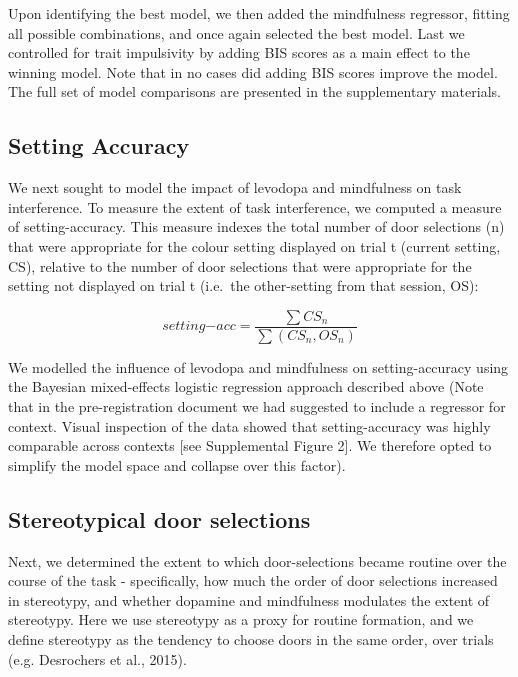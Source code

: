 \documentclass[
  man]{apa6}
\begin{document}
Upon identifying the best model, we then added the mindfulness regressor, fitting all possible combinations, and once again selected the best model. Last we controlled for trait impulsivity by adding BIS scores as a main effect to the winning model. Note that in no cases did adding BIS scores improve the model. The full set of model comparisons are presented in the supplementary materials.

\hypertarget{setting-accuracy}{%
\subsection{Setting Accuracy}\label{setting-accuracy}}

\label{sec:Setting Accuracy}

We next sought to model the impact of levodopa and mindfulness on task interference. To measure the extent of task interference, we computed a measure of setting-accuracy. This measure indexes the total number of door selections (n) that were appropriate for the colour setting displayed on trial t (current setting, CS), relative to the number of door selections that were appropriate for the setting not displayed on trial t (i.e.~the other-setting from that session, OS):

\[
setting\mathrm{-}acc = \frac{\sum{CS_{n}}}{\sum{(CS_{n}, OS_{n})}}
\]

We modelled the influence of levodopa and mindfulness on setting-accuracy using the Bayesian mixed-effects logistic regression approach described above (Note that in the pre-registration document we had suggested to include a regressor for context. Visual inspection of the data showed that setting-accuracy was highly comparable across contexts {[}see Supplemental Figure 2{]}. We therefore opted to simplify the model space and collapse over this factor).

\hypertarget{stereotypical-door-selections}{%
\subsection{Stereotypical door selections}\label{stereotypical-door-selections}}

\label{sec:Stereotypical door selections}

Next, we determined the extent to which door-selections became routine over the course of the task - specifically, how much the order of door selections increased in stereotypy, and whether dopamine and mindfulness modulates the extent of stereotypy. Here we use stereotypy as a proxy for routine formation, and we define stereotypy as the tendency to choose doors in the same order, over trials (e.g. Desrochers et al., 2015).
\end{document}
